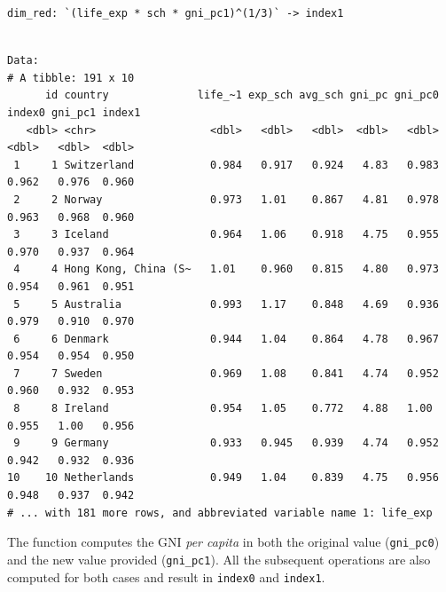 \documentclass[
]{article}
\begin{document}
\begin{verbatim}
dim_red: `(life_exp * sch * gni_pc1)^(1/3)` -> index1
\end{verbatim}

\begin{verbatim}

Data: 
# A tibble: 191 x 10
      id country              life_~1 exp_sch avg_sch gni_pc gni_pc0 index0 gni_pc1 index1
   <dbl> <chr>                  <dbl>   <dbl>   <dbl>  <dbl>   <dbl>  <dbl>   <dbl>  <dbl>
 1     1 Switzerland            0.984   0.917   0.924   4.83   0.983  0.962   0.976  0.960
 2     2 Norway                 0.973   1.01    0.867   4.81   0.978  0.963   0.968  0.960
 3     3 Iceland                0.964   1.06    0.918   4.75   0.955  0.970   0.937  0.964
 4     4 Hong Kong, China (S~   1.01    0.960   0.815   4.80   0.973  0.954   0.961  0.951
 5     5 Australia              0.993   1.17    0.848   4.69   0.936  0.979   0.910  0.970
 6     6 Denmark                0.944   1.04    0.864   4.78   0.967  0.954   0.954  0.950
 7     7 Sweden                 0.969   1.08    0.841   4.74   0.952  0.960   0.932  0.953
 8     8 Ireland                0.954   1.05    0.772   4.88   1.00   0.955   1.00   0.956
 9     9 Germany                0.933   0.945   0.939   4.74   0.952  0.942   0.932  0.936
10    10 Netherlands            0.949   1.04    0.839   4.75   0.956  0.948   0.937  0.942
# ... with 181 more rows, and abbreviated variable name 1: life_exp
\end{verbatim}

\newpage

The function computes the GNI \emph{per capita} in both the original
value (\texttt{gni\_pc0}) and the new value provided
(\texttt{gni\_pc1}). All the subsequent operations are also computed for
both cases and result in \texttt{index0} and \texttt{index1}.
\end{document}
